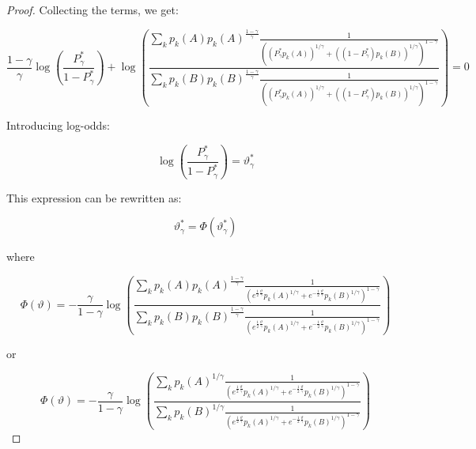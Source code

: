\documentclass{article}
\theoremstyle{definition}
\begin{document}
\begin{proof}
Collecting the terms, we get:

\begin{equation}
    \frac{1-\gamma}{\gamma} \log \left ( \frac {P^*_\gamma}{1-P^*_\gamma}\right ) +
    \log \left ( 
    \frac {\sum_k p_k(A) p_k(A)^{\frac{1-\gamma}{\gamma}} 
    \frac{1}{\left ( (P^*_\gamma p_k(A))^{1/\gamma} + ((1-P^*_\gamma) p_k(B))^{1/\gamma} \right )^{1-\gamma}}}
    {\sum_k p_k(B) p_k(B)^{\frac{1-\gamma}{\gamma}} 
    \frac{1}{\left ( (P^*_\gamma p_k(A))^{1/\gamma} + ((1-P^*_\gamma) p_k(B))^{1/\gamma} \right )^{1-\gamma}}}
    \right ) = 0
\end{equation}

Introducing log-odds:

\begin{equation}
    \log \left ( \frac {P^*_\gamma}{1-P^*_\gamma}\right ) = \vartheta^*_\gamma
\end{equation}

This expression can be rewritten as:

\begin{equation}
    \vartheta^*_\gamma = \Phi(\vartheta^*_\gamma)
\end{equation}

where

\begin{equation}
\label{eq:PhiDef1}
    \Phi(\vartheta) = - \frac{\gamma}{1-\gamma} 
    \log \left ( 
    \frac {\sum_k p_k(A) p_k(A)^{\frac{1-\gamma}{\gamma}} 
    \frac{1}{\left ( e^{\frac{1}{2}\frac{\vartheta}{\gamma}} p_k(A)^{1/\gamma} +  e^{-\frac{1}{2}\frac{\vartheta}{\gamma}} p_k(B)^{1/\gamma} \right )^{1-\gamma}}}
    {\sum_k p_k(B) p_k(B)^{\frac{1-\gamma}{\gamma}} 
    \frac{1}{\left ( e^{\frac{1}{2}\frac{\vartheta}{\gamma}} p_k(A)^{1/\gamma} + e^{-\frac{1}{2}\frac{\vartheta}{\gamma}} p_k(B)^{1/\gamma} \right )^{1-\gamma}}}
    \right )
\end{equation}

or

\begin{equation}
\label{eq:PhiDef2}
    \Phi(\vartheta) = - \frac{\gamma}{1-\gamma} 
    \log \left ( 
    \frac {\sum_k p_k(A)^{1/\gamma} 
    \frac{1}{\left ( e^{\frac{1}{2}\frac{\vartheta}{\gamma}} p_k(A)^{1/\gamma} +  e^{-\frac{1}{2}\frac{\vartheta}{\gamma}} p_k(B)^{1/\gamma} \right )^{1-\gamma}}}
    {\sum_k p_k(B)^{1/\gamma} 
    \frac{1}{\left ( e^{\frac{1}{2}\frac{\vartheta}{\gamma}} p_k(A)^{1/\gamma} + e^{-\frac{1}{2}\frac{\vartheta}{\gamma}} p_k(B)^{1/\gamma} \right )^{1-\gamma}}}
    \right )
\end{equation}


\end{proof}
\end{document}
